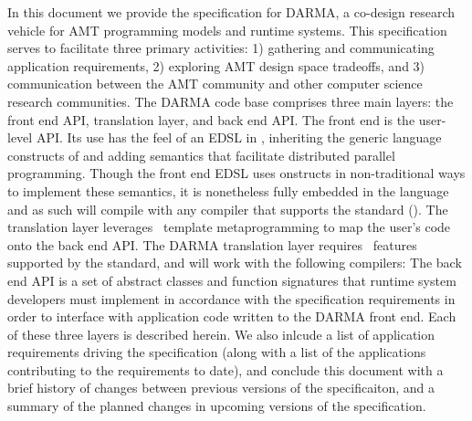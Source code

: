 In this document we provide the specification for DARMA,
a co-design research vehicle for \gls{AMT} programming models and runtime
systems.  This specification serves to facilitate three primary activities: 
1) gathering and communicating application requirements, 2) exploring AMT
design space tradeoffs, and 3) communication between the AMT community and
other computer science research communities.
The DARMA code base comprises three main layers: the \gls{front end} \gls{API},
\gls{translation layer}, and
\gls{back end} \gls{API}.  The \gls{front end} is the user-level \gls{API}. 
Its use has the feel of an \gls{EDSL} in \CC,  inheriting the generic
language constructs of \CC and adding \gls{semantics} that facilitate
distributed parallel programming.  Though the \gls{front end} \gls{EDSL} uses
\CC onstructs in non-traditional ways to implement these semantics, it is
nonetheless fully embedded in the \CC language and as such will compile with any
\CC compiler that supports the  standard ().  The \gls{translation layer} leverages \CC\ \gls{template
metaprogramming} to map the user's code onto the \gls{back end} \gls{API}.
The DARMA \gls{translation layer} requires \CC\ features supported by the 
standard, and will work with the following compilers: 
The \gls{back end} \gls{API} is a set of abstract classes and function
signatures that runtime system developers must implement in accordance with the
specification requirements in order to interface with application code written
to the DARMA front end.  Each of these three layers is described herein. We also
inlcude a list of application requirements driving the specification (along
with a list of the applications contributing to the requirements to date), and
conclude this document with a brief history of changes between previous
versions of the specificaiton, and a summary of the planned changes in upcoming
versions of the specification.

